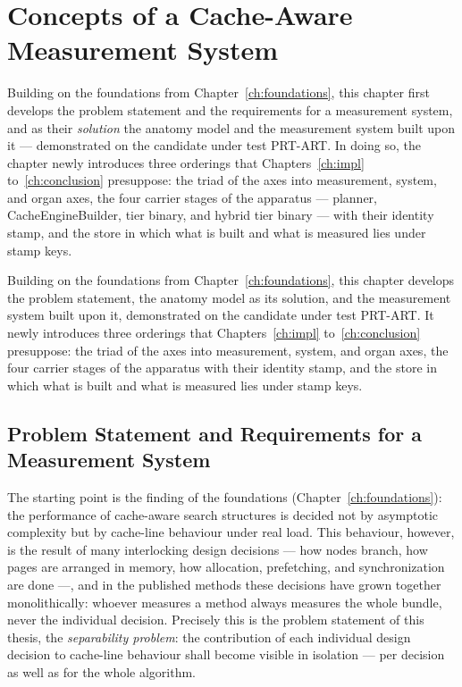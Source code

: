 \chapter{Concepts of a Cache-Aware Measurement System}\label{ch:measurement}


\begin{nurlang}
Building on the foundations from Chapter~\ref{ch:foundations}, this chapter first develops the problem
statement and the requirements for a measurement system, and as their \emph{solution} the anatomy model
and the measurement system built upon it --- demonstrated on the candidate under test PRT-ART\@. In doing so, the
chapter newly introduces three orderings that Chapters~\ref{ch:impl} to~\ref{ch:conclusion} presuppose:
the triad of the axes into measurement, system, and organ axes, the four carrier stages of the
apparatus --- planner, CacheEngineBuilder, tier binary, and hybrid tier binary --- with their identity
stamp, and the store in which what is built and what is measured lies under stamp keys.
\end{nurlang}
\begin{nurkurz}
Building on the foundations from Chapter~\ref{ch:foundations}, this chapter develops the problem statement,
the anatomy model as its solution, and the measurement system built upon it, demonstrated on the candidate
under test PRT-ART\@. It newly introduces three orderings that Chapters~\ref{ch:impl} to~\ref{ch:conclusion}
presuppose: the triad of the axes into measurement, system, and organ axes, the four carrier stages of the
apparatus with their identity stamp, and the store in which what is built and what is measured lies under
stamp keys.
\end{nurkurz}

\section{Problem Statement and Requirements for a Measurement System}\label{sec:task-concerns}
The starting point is the finding of the foundations (Chapter~\ref{ch:foundations}): the performance of
cache-aware search structures is decided not by asymptotic complexity but by cache-line behaviour under
real load. This behaviour, however, is the result of many interlocking design decisions --- how nodes
branch, how pages are arranged in memory, how allocation, prefetching, and synchronization are done ---,
and in the published methods these decisions have grown together monolithically: whoever measures a
method always measures the whole bundle, never the individual decision. Precisely this is the problem
statement of this thesis, the \emph{separability problem}: the contribution of each individual design
decision to cache-line behaviour shall become visible in isolation --- per decision as well as for the
whole algorithm.

